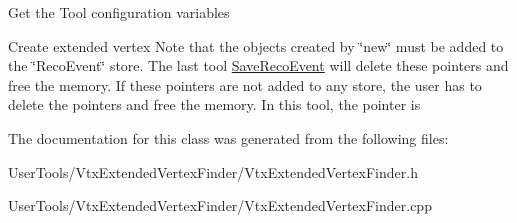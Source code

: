 Get the Tool configuration variables

Create extended vertex Note that the objects created by \char`\"{}new\char`\"{} must be added to the \char`\"{}RecoEvent\char`\"{} store. The last tool \hyperlink{classSaveRecoEvent}{SaveRecoEvent} will delete these pointers and free the memory. If these pointers are not added to any store, the user has to delete the pointers and free the memory. In this tool, the pointer is 

The documentation for this class was generated from the following files:\begin{DoxyCompactItemize}
\item 
UserTools/VtxExtendedVertexFinder/VtxExtendedVertexFinder.h\item 
UserTools/VtxExtendedVertexFinder/VtxExtendedVertexFinder.cpp\end{DoxyCompactItemize}
